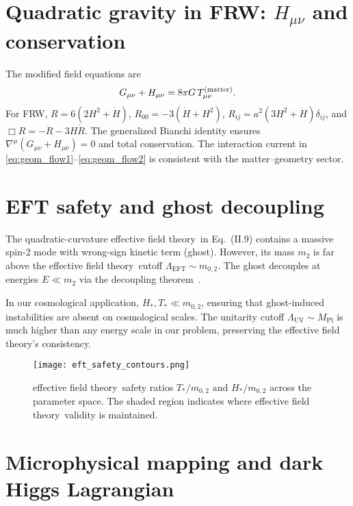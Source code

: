 \documentclass[preprint,aps,prd,onecolumn,nofootinbib,longbibliography]{revtex4-2}
\newcommand{\EFT}{effective field theory}
\numberwithin{equation}{section}
\begin{document}
\FloatBarrier

\appendix

\section{Quadratic gravity in FRW: $H_{\mu\nu}$ and conservation}
\label{app:frwHmunu}
The modified field equations are
\begin{equation}
G_{\mu\nu}+H_{\mu\nu}=8\pi G\,T_{\mu\nu}^{\rm (matter)}.
\end{equation}
For FRW, $R=6(2H^2+\dot H)$, $R_{00}=-3(\dot H+H^2)$, $R_{ij}=a^2(3H^2+\dot H)\delta_{ij}$, and $\Box R=-\ddot R-3H\dot R$. The generalized Bianchi identity ensures $\nabla^\mu(G_{\mu\nu}+H_{\mu\nu})=0$ and total conservation. The interaction current in \eqref{eq:geom_flow1}--\eqref{eq:geom_flow2} is consistent with the matter–geometry sector.

\section{EFT safety and ghost decoupling}
\label{app:eft_safety}

The quadratic-curvature \EFT\ in Eq.~(II.9) contains a massive spin-2 mode with wrong-sign kinetic term (ghost). 
However, its mass $ m_2 $ is far above the \EFT\ cutoff $ \Lambda_{\mathrm{EFT}} \sim m_{0,2} $. 
The ghost decouples at energies $ E \ll m_2 $ via the decoupling theorem~\cite{Stelle1977,Stelle1978}. 

In our cosmological application, $ H_*, T_* \ll m_{0,2} $, ensuring that ghost-induced instabilities 
are absent on cosmological scales. The unitarity cutoff $ \Lambda_{\mathrm{UV}} \sim M_{\mathrm{Pl}} $ 
is much higher than any energy scale in our problem, preserving the \EFT's consistency.

\begin{figure}[H]
  \centering
  \texttt{[image: eft\_safety\_contours.png]}
  \caption{
    \EFT\ safety ratios $ T_*/m_{0,2} $ and $ H_*/m_{0,2} $ across the parameter space.
    The shaded region indicates where \EFT\ validity is maintained.
  }
  \label{fig:eft_safety_contours}
\end{figure}

\section{Microphysical mapping and dark Higgs Lagrangian}
\label{app:micro}
\end{document}

